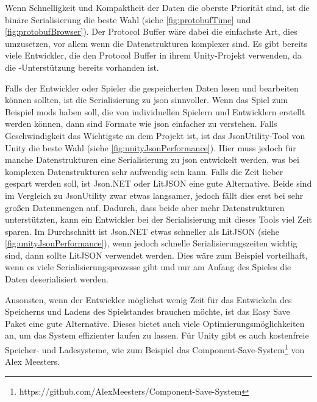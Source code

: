 Wenn Schnelligkeit und Kompaktheit der Daten die oberste Priorität sind, ist die binäre Serialisierung die beste Wahl (siehe \ref{fig:protobufTime} und \ref{fig:protobufBrowser}). Der Protocol Buffer wäre dabei die einfachste Art, dies umzusetzen, vor allem wenn die Datenstrukturen komplexer sind. Es gibt bereits viele Entwickler, die den Protocol Buffer in ihrem Unity-Projekt verwenden, da die \csharp{}-Unterstützung bereits vorhanden ist. 

Falls der Entwickler oder Spieler die gespeicherten Daten lesen und bearbeiten können sollten, ist die Serialisierung zu \ac{json} sinnvoller. Wenn das Spiel zum Beispiel \acp{mod} haben soll, die von individuellen Spielern und Entwicklern erstellt werden können, dann sind Formate wie \ac{json} einfacher zu verstehen. Falls Geschwindigkeit das Wichtigste an dem Projekt ist, ist das JsonUtility-Tool von Unity die beste Wahl (siehe \ref{fig:unityJsonPerformance}). Hier muss jedoch für manche Datenstrukturen eine Serialisierung zu \ac{json} entwickelt werden, was bei komplexen Datenstrukturen sehr aufwendig sein kann. Falls die Zeit lieber gespart werden soll, ist Json.NET oder LitJSON eine gute Alternative. Beide sind im Vergleich zu JsonUtility zwar etwas langsamer, jedoch fällt dies erst bei sehr großen Datenmengen auf. Dadurch, dass beide aber mehr Datenstrukturen unterstützten, kann ein Entwickler bei der Serialisierung mit dieses Tools viel Zeit sparen. Im Durchschnitt ist Json.NET etwas schneller als LitJSON (siehe \ref{fig:unityJsonPerformance}), wenn jedoch schnelle Serialisierungszeiten wichtig sind, dann sollte LitJSON verwendet werden. Dies wäre zum Beispiel vorteilhaft, wenn es viele Serialisierungsprozesse gibt und nur am Anfang des Spieles die Daten deserialisiert werden.  

Ansonsten, wenn der Entwickler möglichst wenig Zeit für das Entwickeln des Speicherns und Ladens des Spielstandes brauchen möchte, ist das Easy Save Paket eine gute Alternative. Dieses bietet auch viele Optimierungsmöglichkeiten an, um das System effizienter laufen zu lassen. Für Unity gibt es auch kostenfreie Speicher- und Ladesysteme, wie zum Beispiel das Component-Save-System\footnote{https://github.com/AlexMeesters/Component-Save-System} von Alex Meesters. 



